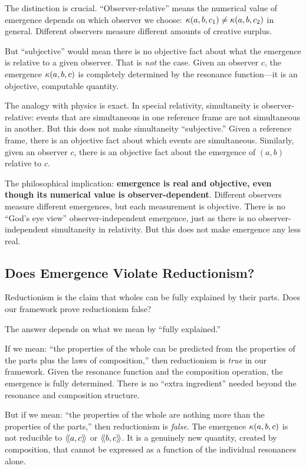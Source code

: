 The distinction is crucial. ``Observer-relative'' means the numerical value
of emergence depends on which observer we choose: $\kappa(a, b, c_1) \neq
\kappa(a, b, c_2)$ in general. Different observers measure different amounts
of creative surplus.

But ``subjective'' would mean there is no objective fact about what the
emergence is relative to a given observer. That is \emph{not} the case. Given
an observer $c$, the emergence $\kappa(a, b, c)$ is completely determined by
the resonance function---it is an objective, computable quantity.

The analogy with physics is exact. In special relativity, simultaneity is
observer-relative: events that are simultaneous in one reference frame are
not simultaneous in another. But this does not make simultaneity ``subjective.''
Given a reference frame, there is an objective fact about which events are
simultaneous. Similarly, given an observer $c$, there is an objective fact
about the emergence of $(a, b)$ relative to $c$.

The philosophical implication: \textbf{emergence is real and objective, even
though its numerical value is observer-dependent}. Different observers measure
different emergences, but each measurement is objective. There is no ``God's
eye view'' observer-independent emergence, just as there is no observer-independent
simultaneity in relativity. But this does not make emergence any less real.

\subsection{Does Emergence Violate Reductionism?}

Reductionism is the claim that wholes can be fully explained by their parts.
Does our framework prove reductionism false?

The answer depends on what we mean by ``fully explained.''

If we mean: ``the properties of the whole can be predicted from the properties
of the parts plus the laws of composition,'' then reductionism is \emph{true}
in our framework. Given the resonance function and the composition operation,
the emergence is fully determined. There is no ``extra ingredient'' needed
beyond the resonance and composition structure.

But if we mean: ``the properties of the whole are nothing more than the
properties of the parts,'' then reductionism is \emph{false}. The emergence
$\kappa(a, b, c)$ is not reducible to $\langle\!\langle a, c \rangle\!\rangle$ or $\langle\!\langle b, c \rangle\!\rangle$. It is a
genuinely new quantity, created by composition, that cannot be expressed as a
function of the individual resonances alone.

